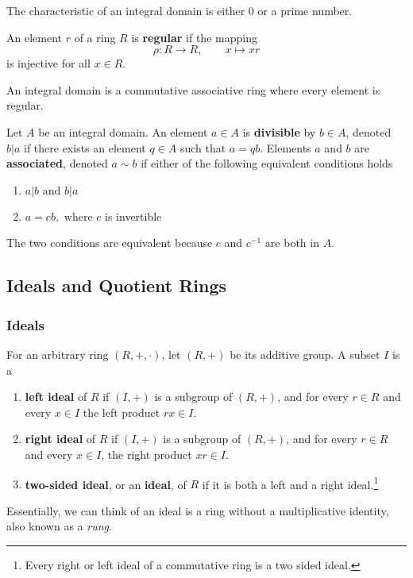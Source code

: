   \begin{theorem}
    The characteristic of an integral domain is either $0$ or a prime number. 
  \end{theorem}

  \begin{definition}
     An element $r$ of a ring $R$ is \textbf{regular} if the mapping 
     \begin{equation}
       \rho: R \longrightarrow R, \qquad x \mapsto x r
     \end{equation}
    is injective for all $x \in R$. 
  \end{definition}

  \begin{theorem}
    An integral domain is a commutative associative ring where every element is regular. 
  \end{theorem}

  \begin{definition}[Factors]
    Let $A$ be an integral domain. An element $a \in A$ is \textbf{divisible} by $b \in A$, denoted $b | a$ if there exists an element $q \in A$ such that $a = q b$. Elements $a$ and $b$ are \textbf{associated}, denoted $a \sim b$ if either of the following equivalent conditions holds
    \begin{enumerate}
        \item $a | b \text{ and } b | a$
        \item $a = c b, \text{ where } c$ is invertible
    \end{enumerate}
    The two conditions are equivalent because $c$ and $c^{-1}$ are both in $A$. 
  \end{definition}

\subsection{Ideals and Quotient Rings}

  \subsubsection{Ideals}

    \begin{definition}[Ideals]
      For an arbitrary ring $(R,+, \cdot)$, let $(R, +)$ be its additive group. A subset $I$ is a 
      \begin{enumerate}
        \item \textbf{left ideal} of $R$ if $(I, +)$ is a subgroup of $(R, +)$, and for every $r \in R$ and every $x \in I$ the left product $rx \in I$. 
        \item \textbf{right ideal} of $R$ if $(I, +)$ is a subgroup of $(R, +)$, and for every $r \in R$ and every $x \in I$, the right product $xr \in I$. 
        \item \textbf{two-sided ideal}, or an \textbf{ideal}, of $R$ if it is both a left and a right ideal.\footnote{Every right or left ideal of a commutative ring is a two sided ideal.}
      \end{enumerate} 
      Essentially, we can think of an ideal is a ring without a multiplicative identity, also known as a \textit{rung}. 
    \end{definition}

